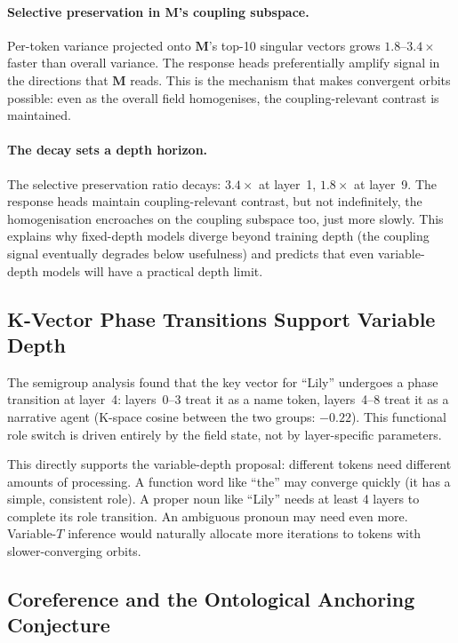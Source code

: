 \documentclass[11pt, a4paper]{article}
\newcommand{\M}{\mathbf{M}}
\theoremstyle{plain}
\theoremstyle{definition}
\theoremstyle{remark}
\begin{document}
\paragraph{Selective preservation in M's coupling subspace.}
Per-token variance projected onto $\M$'s top-10 singular vectors grows $1.8$--$3.4\times$ faster than overall variance.
The response heads preferentially amplify signal in the directions that $\M$ reads.
This is the mechanism that makes convergent orbits possible: even as the overall field homogenises, the coupling-relevant contrast is maintained.

\paragraph{The decay sets a depth horizon.}
The selective preservation ratio decays: $3.4\times$ at layer~1, $1.8\times$ at layer~9.
The response heads maintain coupling-relevant contrast, but not indefinitely, the homogenisation encroaches on the coupling subspace too, just more slowly.
This explains why fixed-depth models diverge beyond training depth (the coupling signal eventually degrades below usefulness) and predicts that even variable-depth models will have a practical depth limit.

\subsection{K-Vector Phase Transitions Support Variable Depth}

The semigroup analysis found that the key vector for ``Lily'' undergoes a phase transition at layer~4: layers~0--3 treat it as a name token, layers~4--8 treat it as a narrative agent (K-space cosine between the two groups: $-0.22$).
This functional role switch is driven entirely by the field state, not by layer-specific parameters.

This directly supports the variable-depth proposal: different tokens need different amounts of processing.
A function word like ``the'' may converge quickly (it has a simple, consistent role).
A proper noun like ``Lily'' needs at least 4 layers to complete its role transition.
An ambiguous pronoun may need even more.
Variable-$T$ inference would naturally allocate more iterations to tokens with slower-converging orbits.

\subsection{Coreference and the Ontological Anchoring Conjecture}
\end{document}
